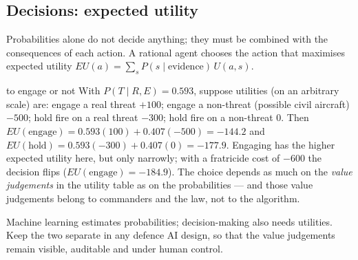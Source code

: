 \documentclass[11pt]{article}
\begin{document}
\subsection{Decisions: expected utility}
Probabilities alone do not decide anything; they must be combined with the consequences of each action. A rational agent chooses the action that maximises expected utility $EU(a)=\sum_sP(s\mid\text{evidence})\,U(a,s)$.
\begin{example}{to engage or not}
With $P(T\mid R,E)=0.593$, suppose utilities (on an arbitrary scale) are: engage a real threat $+100$; engage a non-threat (possible civil aircraft) $-500$; hold fire on a real threat $-300$; hold fire on a non-threat $0$. Then $EU(\text{engage})=0.593(100)+0.407(-500)=-144.2$ and $EU(\text{hold})=0.593(-300)+0.407(0)=-177.9$. Engaging has the higher expected utility here, but only narrowly; with a fratricide cost of $-600$ the decision flips ($EU(\text{engage})=-184.9$). The choice depends as much on the \emph{value judgements} in the utility table as on the probabilities --- and those value judgements belong to commanders and the law, not to the algorithm.
\end{example}
\begin{keypoint}Machine learning estimates probabilities; decision-making also needs utilities. Keep the two separate in any defence AI design, so that the value judgements remain visible, auditable and under human control.\end{keypoint}
\end{document}
